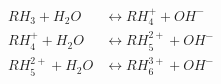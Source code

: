 \documentclass[fleqn, oneside, 11pt]{article}%
\begin{document}
\begin{preview}
\begin{align*}%
RH_{3} + H_{2}O & \leftrightarrow RH^{+}_{4} +OH^{-} \nonumber \\ 
RH^{+}_{4} + H_{2}O & \leftrightarrow RH^{2+}_{5} +OH^{-} \nonumber \\ 
RH^{2+}_{5} + H_{2}O & \leftrightarrow RH^{3+}_{6} +OH^{-} \nonumber \\ 
\end{align*} 
\end{preview}
\end{document}
